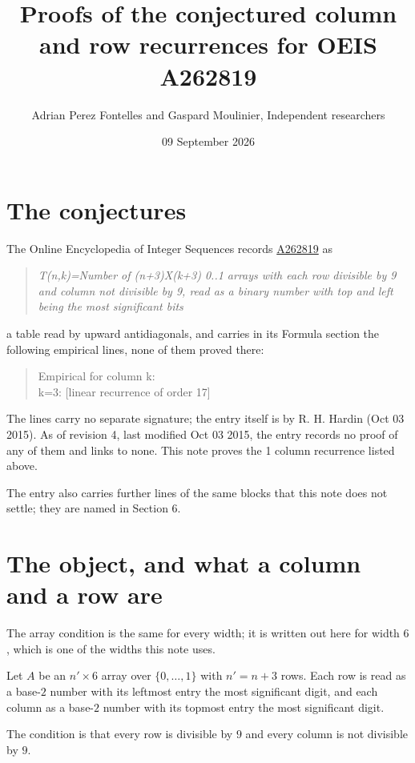 \documentclass[11pt]{article}
\title{Proofs of the conjectured column and row recurrences for OEIS A262819}
\author{Adrian Perez Fontelles and Gaspard Moulinier, Independent researchers}
\date{09 September 2026}
\theoremstyle{definition}
\begin{document}
\maketitle
\section{The conjectures}

The Online Encyclopedia of Integer Sequences records \href{https://oeis.org/A262819}{A262819} as

\begin{quote}\itshape T(n,k)=Number of (n+3)X(k+3) 0..1 arrays with each row divisible by 9 and column not divisible by 9, read as a binary number with top and left being the most significant bits\end{quote}

a table read by upward antidiagonals, and carries in its Formula section the following empirical lines, none of them proved there:

\begin{quote}\ttfamily Empirical for column k:\\
k=3: [linear recurrence of order 17]\end{quote}

The lines carry no separate signature; the entry itself is by R. H. Hardin (Oct 03 2015). As of revision 4, last modified Oct 03 2015, the entry records no proof of any of them and links to none. This note proves the 1 column recurrence listed above.

The entry also carries further lines of the same blocks that this note does not settle; they are named in Section 6.

\section{The object, and what a column and a row are}

The array condition is the same for every width; it is written out here for width $6$, which is one of the widths this note uses.

Let $A$ be an $n' \times 6$ array over $\{0,\dots,1\}$ with $n' = n + 3$ rows. Each row is read as a base-$2$ number with its leftmost entry the most significant digit, and each column as a base-$2$ number with its topmost entry the most significant digit.

The condition is that every row is divisible by $9$ and every column is not divisible by $9$.
\end{document}
